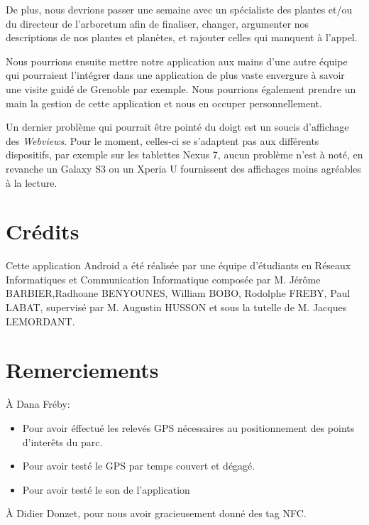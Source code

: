 \documentclass[a4paper,11pt]{article}
\begin{document}
De plus, nous devrions passer une semaine avec un spécialiste des plantes et/ou du directeur de l'arboretum afin de finaliser, changer, argumenter nos descriptions de nos plantes et planètes, et rajouter celles qui manquent à l'appel.

Nous pourrions ensuite mettre notre application aux mains d'une autre équipe qui pourraient l’intégrer dans une application de plus vaste envergure à savoir une visite guidé de Grenoble par exemple. Nous pourrions également prendre un main la gestion de cette application et nous en occuper personnellement.
		
		Un dernier problème qui pourrait être pointé du doigt est un soucis d'affichage des \emph{Webviews}. Pour le moment, celles-ci se s'adaptent pas aux différents dispositifs, par exemple sur les tablettes Nexus 7, aucun problème n'est à noté, en revanche un Galaxy S3 ou un Xperia U fournissent des affichages moins agréables à la lecture.
		
    \section{Crédits}
		
    Cette application Android a été réalisée par une équipe d'étudiants en Réseaux Informatiques et Communication Informatique composée par 
    M. Jérôme BARBIER,Radhoane BENYOUNES, William BOBO, Rodolphe FREBY, Paul LABAT, supervisé par M. Augustin HUSSON et sous la tutelle 
    de M. Jacques LEMORDANT.

    \section{Remerciements}
    À Dana Fréby:
    \begin{itemize}
     \item Pour avoir éffectué les relevés GPS nécessaires au positionnement des points d'interêts du parc.
     \item Pour avoir testé le GPS par temps couvert et dégagé. 
     \item Pour avoir testé le son de l'application
    \end{itemize}
    
  À Didier Donzet, pour nous avoir gracieusement donné des tag NFC.
\end{document}
